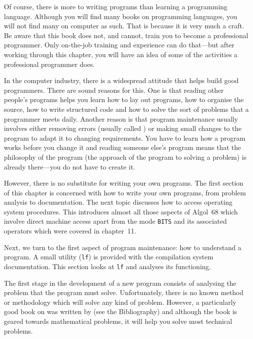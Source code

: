 %
%
Of course, there is more to writing programs than learning a
programming language. Although you will find many books on
programming languages, you will not find many on computer
 as such.  That is because it is very much a craft.
Be aware that this book does not, and cannot, train you to become a
professional programmer.  Only on-the-job training and experience can
do that---but after working through this chapter, you will have an
idea of some of the activities a professional programmer does.

In the computer industry, there is a widespread attitude that
 helps build good
programmers. There are sound reasons for this. One is that reading
other people's programs helps you learn how to lay out programs, how
to organise the source, how to write structured code and how to solve
the sort of problems that a programmer meets daily. Another reason is
that program maintenance usually involves either removing errors
(usually called ) or making small changes to the program
to adapt it to changing requirements. You have to learn how a program
works before you change it and reading someone else's program means
that the philosophy of the program (the approach of the program to
solving a problem) is already there---you do not have to create it.

However, there is no substitute for writing your own programs. The
first section of this chapter is concerned with how to write your own
programs, from problem analysis to documentation. The next topic
discusses how to access operating system procedures.  This introduces
almost all those aspects of Algol~68 which involve direct machine
access apart from the mode \verb|BITS| and its associated operators
which were covered in chapter~11.

Next, we turn to the first aspect of program maintenance: how to
understand a program.  A small utility (\verb|lf|) is provided with
the  compilation system documentation.  This section looks
at \verb|lf| and analyses its functioning.

The first stage in the development of a new program consists of
analysing the problem that the program must solve. Unfortunately,
there is no known method or methodology which will solve any kind of
problem.  However, a particularly good book on 
was written by (see
the Bibliography) and although the book is geared towards
mathematical problems, it will help you solve most technical problems.

